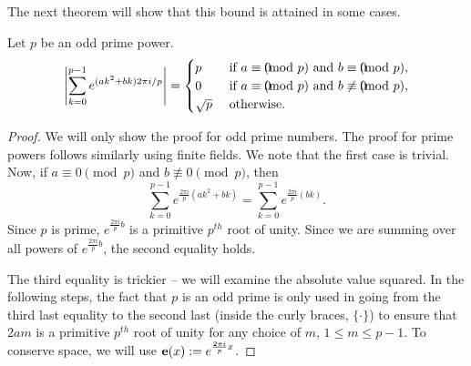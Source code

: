 The next theorem will show that this bound is attained in some cases.

\begin{lemma} \label{lem:p-prime-sum}
 Let $p$ be an odd prime power.
 $$\left|\sum_{k=0}^{p-1} e^{(ak^2 + bk)2\pi i/p}\right| = \begin{cases}
                                                                    p & \text{ if } a \equiv 0 \hskip-10pt\pmod p \text{ and } b \equiv 0 \hskip-10pt\pmod p,\\
                                                                    0 & \text{ if } a \equiv 0 \hskip-10pt\pmod p \text{ and } b \not\equiv 0 \hskip-10pt\pmod p,\\
                                                             \sqrt{p} & \text{ otherwise.}
                                                                   \end{cases}$$
 \begin{proof}
  We will only show the proof for odd prime numbers. The proof for prime powers follows similarly using finite fields.
  We note that the first case is trivial. Now, if $a \equiv 0 \pmod p$ and $b \not\equiv 0 \pmod p$, then $$\sum_{k=0}^{p-1} e^{\frac{2\pi i}{p}(ak^2 + bk)} = \sum_{k=0}^{p-1} e^{\frac{2\pi i}{p}(bk)}.$$ Since $p$ is prime, $e^{\frac{2\pi i}{p}b}$ is a primitive $p^{th}$ root of unity. Since we are summing over all powers of $e^{\frac{2\pi i}{p}b}$, the second equality holds.

  The third equality is trickier -- we will examine the absolute value squared. In the following steps, the fact that $p$ is an odd prime is only used in going from the third last equality to the second last (inside the curly braces, $\{\cdot\}$) to ensure that $2am$ is a primitive $p^{th}$ root of unity for any choice of $m$, $1 \leq m \leq p-1$. To conserve space, we will use ${\bf e}(x) := e^{\frac{2\pi i}{p}x}$.


\end{proof}
\end{lemma}

